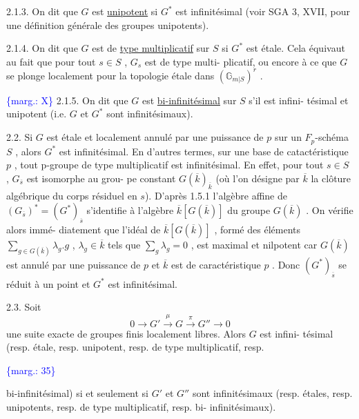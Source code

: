 \documentclass[11pt]{article}
\newcommand{\scanpage}[1]{\par\bigskip\noindent{\small\sffamily[scan #1]}\par}
\newcommand{\mspage}[1]{{\small\sffamily[p.\,#1]}}
\newcommand{\hand}[1]{\textcolor{blue}{#1}}
\newcommand{\margin}[1]{\textcolor{blue}{\{\textsf{marg.:} #1\}}}
\newcommand{\uline}[1]{\underline{#1}}
\begin{document}
2.1.3. \quad On dit que $G$ est \uline{unipotent} si $G^*$ est infinitésimal (voir
SGA 3, XVII, pour une définition générale des groupes unipotents).

2.1.4. \quad On dit que $G$ est de \uline{type multiplicatif} sur $S$ si $G^*$ est
étale. Cela équivaut au fait que pour tout $s \in S$ , $G_s$ est de type multi-%
plicatif, ou encore à ce que $G$ se plonge localement pour la topologie
étale dans $(\mathbb{G}_{m|S})^r$ .

\margin{X} 2.1.5. \quad On dit que $G$ est \uline{bi-infinitésimal} sur $S$ s'il est infini-%
tésimal et unipotent (i.e. $G$ et $G^*$ sont infinitésimaux).

2.2. \quad Si $G$ est étale et localement annulé par une puissance de $p$
sur un $F_p$-schéma $S$ , alors $G^*$ est infinitésimal. En d'autres termes,
sur une base de catactéristique $p$ , tout p-groupe de type multiplicatif
est infinitésimal. En effet, pour tout $s \in S$ , $G_{\overline{s}}$ est isomorphe au grou-%
pe constant $G(\overline{k})_{\overline{k}}$ (où l'on désigne par $\overline{k}$ la clôture algébrique du
corps résiduel en $s$). D'après 1.5.1 l'algèbre affine de $(G_{\overline{s}})^* = (G^*)_{\overline{s}}$
s'identifie à l'algèbre $\overline{k}[G(\overline{k})]$ du groupe $G(\overline{k})$ . On vérifie alors immé-%
diatement que l'idéal de $\overline{k}[G(\overline{k})]$ , formé des éléments $\sum\limits_{g\in G(\overline{k})} \lambda_g.g$ , $\lambda_g \in \overline{k}$
tels que $\sum\limits_{g} \lambda_g = 0$ , est maximal et nilpotent car $G(\overline{k})$ est annulé par une
puissance de $p$ et $\overline{k}$ est de caractéristique $p$ . Donc $(G^*)_{\overline{s}}$ se réduit
à un point et $G^*$ est infinitésimal.

2.3. \quad Soit
\[
0 \to G' \overset{\mu}{\to} G \overset{\pi}{\to} G'' \to 0
\]
une suite exacte de groupes finis localement libres. Alors $G$ est infini-%
tésimal (resp. étale, resp. unipotent, resp. de type multiplicatif, resp.

\margin{35}

\clearpage
\scanpage{129/36}
\mspage{\hand{II.8}}

bi-infinitésimal) si et seulement si $G'$ et $G''$ sont infinitésimaux
(resp. étales, resp. unipotents, resp. de type multiplicatif, resp. bi-%
infinitésimaux).
\end{document}
